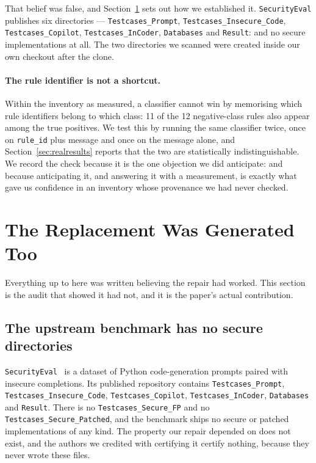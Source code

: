 \documentclass[journal]{IEEEtran}
\providecommand{\citep}[1]{\cite{#1}}
\theoremstyle{definition}
\newcommand{\RNrulesFp}{12}
\newcommand{\RNrulesShared}{11}
\begin{document}
That belief was false, and Section~\ref{sec:secondfailure} sets out how we
established it. \texttt{SecurityEval} publishes six directories ---
\texttt{Testcases\_\allowbreak{}Prompt}, \texttt{Testcases\_\allowbreak{}Insecure\_\allowbreak{}Code},
\texttt{Testcases\_\allowbreak{}Copilot}, \texttt{Testcases\_\allowbreak{}InCoder}, \texttt{Databases} and
\texttt{Result}: and no secure implementations at all. The two directories we
scanned were created inside our own checkout after the clone.

\paragraph{The rule identifier is not a shortcut.}
Within the inventory as measured, a classifier cannot win by memorising which
rule identifiers belong to which class: \RNrulesShared{} of the \RNrulesFp{}
negative-class rules also appear among the true positives. We test this by
running the same classifier twice, once on \texttt{rule\_id} plus message and
once on the message alone, and Section~\ref{sec:realresults} reports that the two
are statistically indistinguishable. We record the check because it is the one
objection we did anticipate: and because anticipating it, and answering it
with a measurement, is exactly what gave us confidence in an inventory whose
provenance we had never checked.

\section{The Replacement Was Generated Too}
\label{sec:secondfailure}

Everything up to here was written believing the repair had worked. This section
is the audit that showed it had not, and it is the paper's actual contribution.

\subsection{The upstream benchmark has no secure directories}

\texttt{SecurityEval}~\citep{siddiq2022securityeval} is a dataset of Python
code-generation prompts paired with insecure completions. Its published
repository contains \texttt{Testcases\_\allowbreak{}Prompt},
\texttt{Testcases\_\allowbreak{}Insecure\_\allowbreak{}Code}, \texttt{Testcases\_\allowbreak{}Copilot},
\texttt{Testcases\_\allowbreak{}InCoder}, \texttt{Databases} and \texttt{Result}. There is no
\texttt{Testcases\_\allowbreak{}Secure\_\allowbreak{}FP} and no \texttt{Testcases\_\allowbreak{}Secure\_\allowbreak{}Patched}, and
the benchmark ships no secure or patched implementations of any kind. The
property our repair depended on does not exist, and the authors we credited with
certifying it certify nothing, because they never wrote these files.
\end{document}
